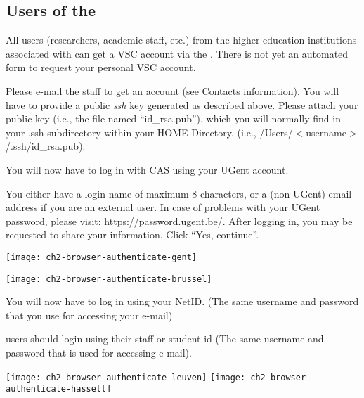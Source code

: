 \subsection{Users of the \association}
\label{sec:users-of-association}

All users (researchers, academic staff, etc.) from the higher education
institutions associated with \university can get a VSC account via the \university. There is not
yet an automated form to request your personal VSC account.

Please e-mail the \hpc staff to get an account (see Contacts information).
You will have to provide a public \emph{ssh} key generated as described
above. Please attach your public key (i.e., the file named ``id\_rsa.pub''),
which you will normally find in your .ssh subdirectory within your HOME
Directory. (i.e., /Users/$<$username$>$/.ssh/id\_rsa.pub).


\fi %

\ifgent
  You will now have to log in with CAS using your UGent account.

  You either have a
  login name of maximum 8 characters, or a (non-UGent) email address if you are an external
  user. In case of problems with your UGent password, please visit:
  \url{https://password.ugent.be/}. After logging in, you may be requested
  to share your information. Click ``Yes, continue''.
  \begin{center}
  \texttt{[image: ch2-browser-authenticate-gent]}
  \end{center}
\fi

\ifbrussel
  \begin{center}
  \texttt{[image: ch2-browser-authenticate-brussel]}
  \end{center}

  You will now have to log in using your NetID. (The same username and password that you use for accessing your e-mail)

\fi

\ifleuven
\hpc users should login using their staff or student id
(The same username and password that is used for accessing e-mail).

 \begin{center}
  \texttt{[image: ch2-browser-authenticate-leuven]}
  \texttt{[image: ch2-browser-authenticate-hasselt]}
  \end{center}


